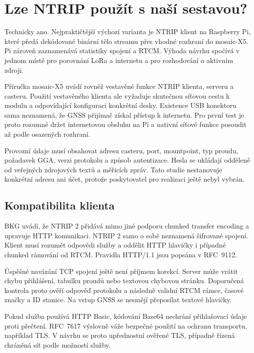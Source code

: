 \documentclass[11pt,a4paper]{article}
\begin{document}
\section{Lze NTRIP použít s naší sestavou?}
Technicky ano. Nejpraktičtější výchozí varianta je NTRIP klient na Raspberry Pi, které předá dekódované binární tělo streamu přes vhodné rozhraní do mosaic-X5. Pi zároveň zaznamenává statistiky spojení a RTCM. Výhoda návrhu spočívá v jednom místě pro porovnání LoRa a internetu a pro rozhodování o aktivním zdroji.

Příručka mosaic-X5 uvádí rovněž vestavěné funkce NTRIP klienta, serveru a casteru.\cite{mosaic} Použití vestavěného klienta ale vyžaduje skutečnou síťovou cestu k modulu a odpovídající konfiguraci konkrétní desky. Existence USB konektoru sama neznamená, že GNSS přijímač získal přístup k internetu. Pro první test je proto rozumné držet internetovou obsluhu na Pi a nativní síťové funkce posoudit až podle osazených rozhraní.

Provozní údaje musí obsahovat adresu casteru, port, mountpoint, typ proudu, požadavek GGA, verzi protokolu a způsob autentizace. Hesla se ukládají odděleně od veřejných zdrojových textů a měřicích zpráv. Tato studie nestanovuje konkrétní adresu ani účet, protože poskytovatel pro realizaci ještě nebyl vybrán.

\subsection{Kompatibilita klienta}
BKG uvádí, že NTRIP 2 přidává mimo jiné podporu chunked transfer encoding a upravuje HTTP komunikaci.\cite{bkg} NTRIP 2 samo o sobě neznamená šifrované spojení. Klient musí rozumět odpovědi služby a oddělit HTTP hlavičky i případné chunked rámování od RTCM. Pravidla HTTP/1.1 jsou popsána v RFC~9112.\cite{http}

Úspěšné navázání TCP spojení ještě není příjmem korekcí. Server může vrátit chybu přihlášení, tabulku proudů nebo textovou chybovou stránku. Doporučená kontrola proto ověří odpověď protokolu a následně validní RTCM rámce, časové značky a ID stanice. Na vstup GNSS se nesmějí přeposílat textové hlavičky.

Pokud služba používá HTTP Basic, kódování Base64 nechrání přihlašovací údaje proti přečtení. RFC~7617 výslovně váže bezpečné použití na ochranu transportu, například TLS.\cite{basic} V návrhu se proto upřednostní ověřené TLS, případně řízená chráněná síť podle možností služby.
\end{document}
